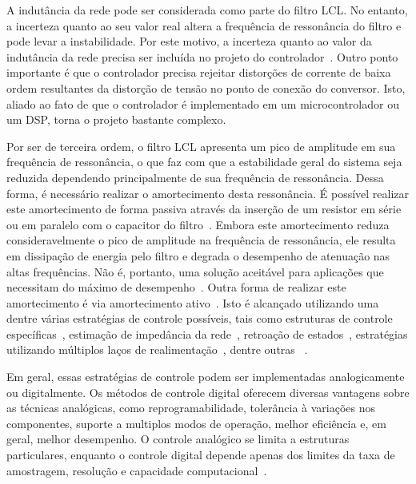	A indutância da rede pode ser considerada como parte do filtro LCL. No entanto,
	a incerteza quanto ao seu valor real altera a frequência de ressonância do
	filtro e pode levar a instabilidade. Por este motivo, a incerteza quanto ao
	valor da indutância da rede precisa ser incluída no projeto do
	controlador~\cite{ref:LISERRE}. Outro ponto importante é que o controlador
	precisa rejeitar distorções de corrente de baixa ordem resultantes da
	distorção de tensão no ponto de conexão do conversor. Isto, aliado ao fato de
	que o controlador é implementado em um microcontrolador ou um DSP, torna o
	projeto bastante complexo.

	Por ser de terceira ordem, o filtro LCL apresenta um pico de amplitude em
	sua frequência de ressonância, o que faz com que a estabilidade geral do
	sistema seja reduzida dependendo principalmente de sua frequência de
	ressonância. Dessa forma, é necessário realizar o amortecimento desta
	ressonância. É possível realizar este amortecimento de forma passiva
	através da inserção	de um resistor em série ou em paralelo com o capacitor
	do filtro~\cite{ref:AHMED}. Embora este amortecimento reduza consideravelmente
	o pico de amplitude na frequência de ressonância, ele resulta em dissipação de
	energia pelo filtro e degrada o desempenho de atenuação nas altas frequências. Não é,
	portanto, uma solução aceitável para aplicações que necessitam do máximo de
	desempenho~\cite{ref:SHEN}. Outra forma de realizar este amortecimento é via
	amortecimento ativo~\cite{ref:GERVASIO}. Isto é alcançado utilizando uma dentre
	várias estratégias de controle possíveis, tais como estruturas de controle
	específicas~\cite{ref:WU}, estimação de impedância da rede~\cite{ref:BLAABJERG},
	retroação de estados~\cite{ref:MASSING}, estratégias utilizando múltiplos laços de
	realimentação~\cite{ref:POH}, dentre outras~\cite{ref:WESSELS} \cite{ref:MORENO}
	\cite{ref:YANG}.

	Em geral, essas estratégias de controle podem ser implementadas analogicamente ou
	digitalmente. Os métodos de controle digital oferecem diversas vantagens sobre
	as técnicas analógicas, como reprogramabilidade, tolerância à variações
	nos componentes, suporte a multiplos modos de operação, melhor eficiência e,
	em geral, melhor desempenho. O controle analógico se limita a estruturas particulares,
	enquanto o controle digital depende apenas dos limites da taxa de amostragem,
	resolução e capacidade computacional~\cite{ref:KIMBALL}.

